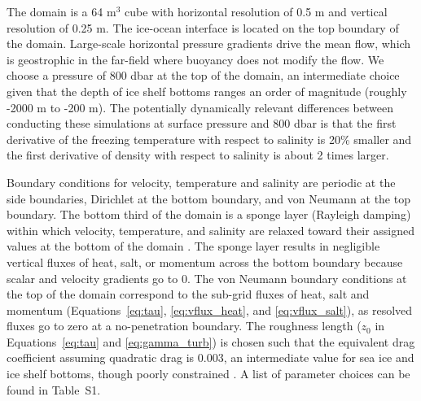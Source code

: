 \documentclass[draft]{styles/agujournal2019}
\begin{document}
The domain is a 64 m$^3$ cube with horizontal resolution of 0.5 m and vertical resolution of 0.25 m. The ice-ocean interface is located on the top boundary of the domain. Large-scale horizontal pressure gradients drive the mean flow, which is geostrophic in the far-field where buoyancy does not modify the flow. We choose a pressure of 800 dbar at the top of the domain, an intermediate choice given that the depth of ice shelf bottoms ranges an order of magnitude (roughly -2000 m to -200 m). The potentially dynamically relevant differences between conducting these simulations at surface pressure and 800 dbar is that the first derivative of the freezing temperature with respect to salinity is 20\% smaller and the first derivative of density with respect to salinity is about 2 times larger.

Boundary conditions for velocity, temperature and salinity are periodic at the side boundaries, Dirichlet at the bottom boundary, and von Neumann at the top boundary. The bottom third of the domain is a sponge layer (Rayleigh damping) within which velocity, temperature, and salinity are relaxed toward their assigned values at the bottom of the domain \cite{klemp_numerical_1978, maronga_parallelized_2015}. The sponge layer results in negligible vertical fluxes of heat, salt, or momentum across the bottom boundary because scalar and velocity gradients go to 0. The von Neumann boundary conditions at the top of the domain correspond to the sub-grid fluxes of heat, salt and momentum (Equations~\ref{eq:tau}, \ref{eq:vflux_heat}, and \ref{eq:vflux_salt}), as resolved fluxes go to zero at a no-penetration boundary. The roughness length ($z_0$ in Equations~\ref{eq:tau} and \ref{eq:gamma_turb}) is chosen such that the equivalent drag coefficient assuming quadratic drag is 0.003, an intermediate value for sea ice and ice shelf bottoms, though poorly constrained \cite{holland_modeling_1999, holland_effects_2006, macayeal_numerical_1984, nicholls_measurements_2006}. A list of parameter choices can be found in Table~S1.
\end{document}
